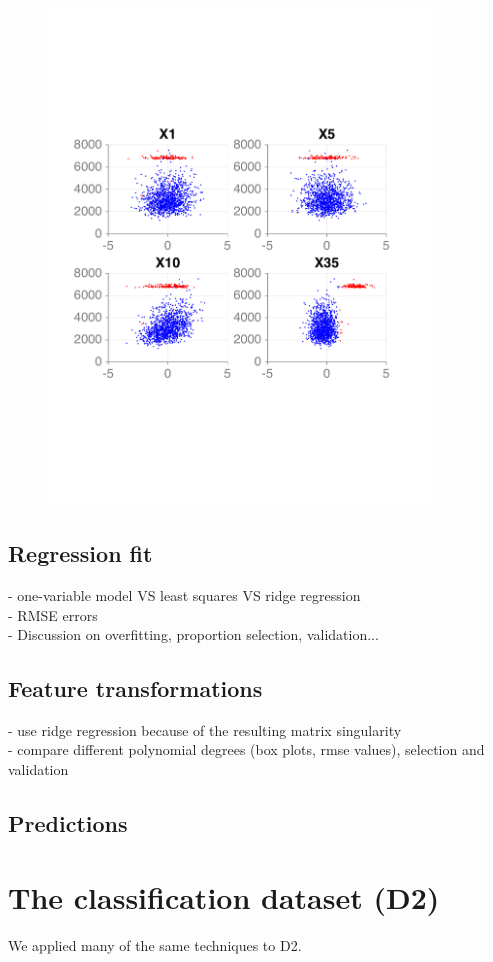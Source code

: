 \documentclass{article} %
\begin{document}
\begin{figure}[!t]
{    \includegraphics[width=4in]{figures/regression/model-separation-rough.pdf}
    \label{fig:twoModelsRough}
  }
  \caption{}
  \end{figure}


  \subsection{Regression fit}
  - one-variable model VS least squares VS ridge regression\\
  - RMSE errors\\
  - Discussion on overfitting, proportion selection, validation...

  \subsection{Feature transformations}
  - use ridge regression because of the resulting matrix singularity\\
  - compare different polynomial degrees (box plots, rmse values), selection and validation

  \subsection{Predictions}



\section{The classification dataset (D2)}
  We applied many of the same techniques to D2.
\end{document}
